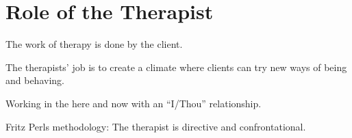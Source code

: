 \section{Role of the Therapist}

\begin{coloredlist}
    \item The work of therapy is done by the client.
    \item The therapists' job is to create a climate where clients can try new ways of being and behaving.
    \item Working in the here and now with an ``I/Thou'' relationship.
    \item Fritz Perls methodology: The therapist is directive and confrontational.
\end{coloredlist}